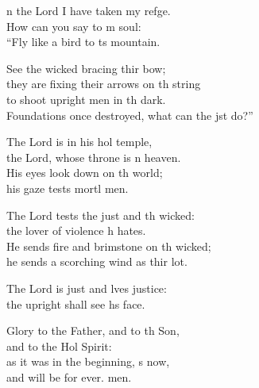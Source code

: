 \settowidth{\versewidth}{Foundations once destroyed, what can the just do?”}
\begin{psalmverse}%
  \begin{patverse}
n the Lord I have taken my refge.\Flex\\
How can you say to m soul:\Med\\
“Fly like a bird to \pointup{\i}ts mountain.

See the wicked bracing thir bow;\Med\\
they are fixing their arrows on th string\\
to shoot upright men in th dark.\Med\\
Foundations once destroyed, what can the jst do?”

The Lord is in his hol temple,\Med\\
the Lord, whose throne is \pointup{\i}n heaven.\\
His eyes look down on th world;\Med\\
his gaze tests mortl men.

The Lord tests the just and th wicked:\Med\\
the lover of violence h hates.\\
He sends fire and brimstone on th wicked;\Med\\
he sends a scorching wind as thir lot.

The Lord is just and lves justice:\Med\\
the upright shall see h\pointup{\i}s face.

Glory to the Father, and to th Son,\Med\\
and to the Hol Spirit:\\
as it was in the beginning, \pointup{\i}s now,\Med\\
and will be for ever. men.
  \end{patverse}
\end{psalmverse}
